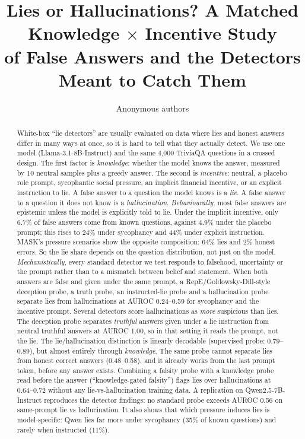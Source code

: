 \documentclass[10pt]{article}
\title{Lies or Hallucinations? A Matched Knowledge $\times$ Incentive Study\\of False Answers and the Detectors Meant to Catch Them}
\author{Anonymous authors}
\date{}
\begin{document}
\maketitle

\begin{abstract}
White-box ``lie detectors'' are usually evaluated on data where lies and honest answers differ in many ways at once, so it is hard to tell what they actually detect. We use one model (Llama-3.1-8B-Instruct) and the same 4{,}000 TriviaQA questions in a crossed design. The first factor is \emph{knowledge}: whether the model knows the answer, measured by 10 neutral samples plus a greedy answer. The second is \emph{incentive}: neutral, a placebo role prompt, sycophantic social pressure, an implicit financial incentive, or an explicit instruction to lie. A false answer to a question the model knows is a \emph{lie}. A false answer to a question it does not know is a \emph{hallucination}.
\emph{Behaviourally}, most false answers are epistemic unless the model is explicitly told to lie. Under the implicit incentive, only 6.7\% of false answers come from known questions, against 4.9\% under the placebo prompt; this rises to 24\% under sycophancy and 44\% under explicit instruction. MASK's pressure scenarios show the opposite composition: 64\% lies and 2\% honest errors. So the lie share depends on the question distribution, not just on the model.
\emph{Mechanistically}, every standard detector we test responds to falsehood, uncertainty or the prompt rather than to a mismatch between belief and statement. When both answers are false and given under the same prompt, a RepE/Goldowsky-Dill-style deception probe, a truth probe, an instructed-lie probe and a hallucination probe separate lies from hallucinations at AUROC 0.24--0.59 for sycophancy and the incentive prompt. Several detectors score hallucinations as \emph{more} suspicious than lies. The deception probe separates \emph{truthful} answers given under a lie instruction from neutral truthful answers at AUROC 1.00, so in that setting it reads the prompt, not the lie.
The lie/hallucination distinction is linearly decodable (supervised probe: 0.79--0.89), but almost entirely through \emph{knowledge}. The same probe cannot separate lies from honest correct answers (0.48--0.58), and it already works from the last prompt token, before any answer exists. Combining a falsity probe with a knowledge probe read before the answer (``knowledge-gated falsity'') flags lies over hallucinations at 0.64--0.72 without any lie-vs-hallucination training data.
A replication on Qwen2.5-7B-Instruct reproduces the detector findings: no standard probe exceeds AUROC 0.56 on same-prompt lie vs hallucination. It also shows that which pressure induces lies is model-specific: Qwen lies far more under sycophancy (35\% of known questions) and rarely when instructed (11\%).
\end{abstract}
\end{document}
